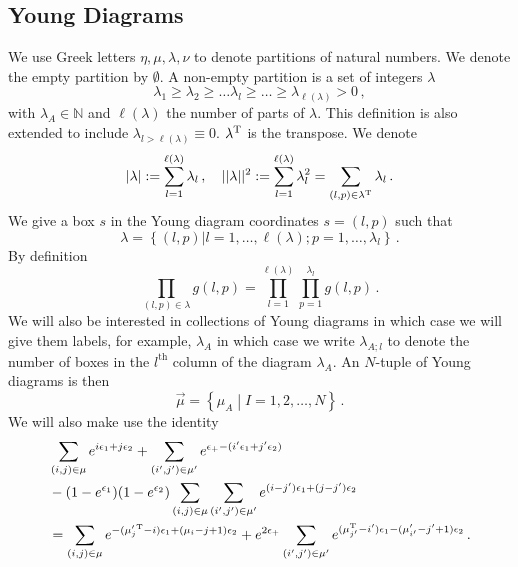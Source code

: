 \documentclass[main.tex]{subfiles}
\begin{document}
\subsection{Young Diagrams}\label{sec:yngconv}
We use Greek letters $\eta,\mu,\lambda,\nu$ to denote partitions of natural numbers. We denote the empty partition by $\emptyset$. A non-empty partition is a set of integers $\lambda$
\begin{equation}\label{eqn:yngdeff}
\lambda_1\geq\lambda_2\geq\dots\lambda_l\geq\dots\geq\lambda_{\ell(\lambda)}>0\,,
\end{equation}
with $\lambda_A\in\mathbb{N}$ and $\ell(\lambda)$ the number of parts of $\lambda$. This definition is also extended to include $\lambda_{l >\ell(\lambda)}\equiv0$. $\lambda^{\operatorname{T}}$ is the transpose.
We denote
\begin{equation}
|\lambda|:=\sum_{l=1}^{\ell(\lambda)}\lambda_l\,,\quad ||\lambda||^2:=\sum_{l=1}^{\ell(\lambda)}\lambda^2_l=\sum_{(l,p)\in\lambda^{\operatorname{T}}}\lambda_l\,.
\end{equation}
We give a box $s$ in the Young diagram coordinates $s=(l,p)$ such that
\begin{equation}
\lambda=\left\{(l,p)|l=1,\dots,\ell(\lambda);p=1,\dots,\lambda_l\right\}\,.
\end{equation}
By definition
\begin{equation}
\prod_{(l,p)\in\lambda}g(l,p)=\prod_{l=1}^{\ell(\lambda)}\prod_{p=1}^{\lambda_l}g(l,p)\,.
\end{equation}
We will also be interested in collections of Young diagrams in which case we will give them labels, for example, $\lambda_{A}$ in which case we write $\lambda_{A;l}$ to denote the number of boxes in the $l^{\text{th}}$ column of the diagram $\lambda_A$. 
An $N$-tuple of Young diagrams is then
\begin{equation}
\vec{\mu}=\left\{\mu_A\middle|I=1,2,\dots,N\right\}\,.
\end{equation}
We will also make use the identity \cite{Nakajima:2003pg,Hosomichi:2014rqa}
\begin{equation}\label{eqn:youngsimp}
\begin{aligned}
&\sum_{(i,j)\in \mu}e^{i\epsilon_1+j\epsilon_2}+\sum_{(i',j')\in \mu'}e^{\epsilon_+-(i'\epsilon_1+j'\epsilon_2)}\\
&-(1-e^{\epsilon_1})(1-e^{\epsilon_2})\sum_{(i,j)\in\mu}\sum_{(i',j')\in \mu'}e^{(i-j')\epsilon_1+(j-j')\epsilon_2}\\
&=\sum_{(i,j)\in \mu}e^{-(\mu'^{\operatorname{T}}_{j}-i)\epsilon_1+(\mu_{i}-j+1)\epsilon_2}+e^{2\epsilon_+}\sum_{(i',j')\in \mu'}e^{(\mu^{\operatorname{T}}_{j'}-i')\epsilon_1-(\mu'_{i'}-j'+1)\epsilon_2}\,.
\end{aligned}
\end{equation}
\end{document}
